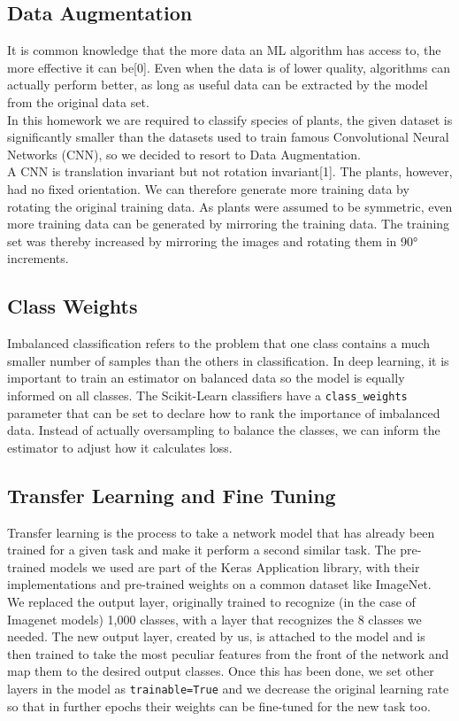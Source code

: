 \documentclass[11pt, oneside]{article}
\begin{document}
\subsection{Data Augmentation}
It is common knowledge that the more data an ML algorithm has access to, the more effective it can be[0]. Even when the data is of lower quality, algorithms can actually perform better, as long as useful data can be extracted by the model from the original data set.\\
In this homework we are required to classify species of plants, the given dataset is significantly smaller than the datasets used to train famous Convolutional Neural Networks (CNN), so we decided to resort to Data Augmentation. \\
A CNN is translation invariant but not rotation invariant[1]. The plants, however, had no fixed orientation. We can therefore generate more training data by rotating the original training data. As plants were assumed to be symmetric, even more training data can be generated by mirroring the training data. The training set was thereby increased by mirroring the images and rotating them in 90° increments. 
\subsection{Class Weights}
Imbalanced classification refers to the problem that one class contains a much smaller number of samples than the others in classification. In deep learning, it is important to train an estimator on balanced data so the model is equally informed on all classes. The Scikit-Learn classifiers have a \texttt{class\_weights} parameter that can be set to declare how to rank the importance of imbalanced data. Instead of actually oversampling to balance the classes, we can inform the estimator to adjust how it calculates loss.
\subsection{Transfer Learning and Fine Tuning}
Transfer learning is the process to take a network model that has already been trained for a given task and make it perform a second similar task. The pre-trained models we used are part of the Keras Application library, with their implementations and pre-trained weights on a common dataset like ImageNet. \\
We replaced the output layer, originally trained to recognize (in the case of Imagenet models) 1,000 classes, with a layer that recognizes the 8 classes we needed.
The new output layer, created by us, is attached to the model and is then trained to take the most peculiar features from the front of the network and map them to the desired output classes.
Once this has been done, we set other layers in the model as \texttt{trainable=True} and we decrease the original learning rate so that in further epochs their weights can be fine-tuned for the new task too.
\end{document}
